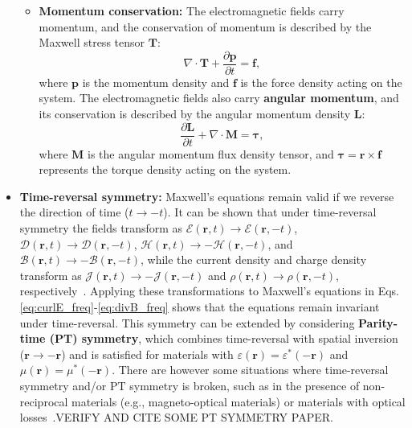 \begin{itemize}
\begin{itemize}
        \item \textbf{Momentum conservation:} The electromagnetic fields carry momentum, and the conservation of momentum is described by the Maxwell stress tensor $\mathbf{T}$:
        \begin{equation}
            \nabla \cdot \mathbf{T} + \frac{\partial \mathbf{p}}{\partial t} = \mathbf{f},
        \end{equation}
        where $\mathbf{p}$ is the momentum density and $\mathbf{f}$ is the force density acting on the system. The electromagnetic fields also carry \textbf{angular momentum}, and its conservation is described by the angular momentum density $\mathbf{L}$:
                    \begin{equation}
                        \frac{\partial \mathbf{L}}{\partial t} + \nabla \cdot \mathbf{M} = \boldsymbol{\tau},
                    \end{equation}
                    where $\mathbf{M}$ is the angular momentum flux density tensor, and $\boldsymbol{\tau} = \mathbf{r} \times \mathbf{f}$ represents the torque density acting on the system.
    \end{itemize}
    
    \item \textbf{Time-reversal symmetry:} Maxwell's equations remain valid if we reverse the direction of time ($t\to-t$). It can be shown that under time-reversal symmetry
                                                the fields transform as $\bm{\mathcal{E}}(\mathbf{r}, t)\to\bm{\mathcal{E}}(\mathbf{r}, -t)$,  $\bm{\mathcal{D}}(\mathbf{r}, t)\to\bm{\mathcal{D}}(\mathbf{r}, -t)$,
                                                 $\bm{\mathcal{H}}(\mathbf{r}, t)\to-\bm{\mathcal{H}}(\mathbf{r}, -t)$, and $\bm{\mathcal{B}}(\mathbf{r}, t)\to-\bm{\mathcal{B}}(\mathbf{r}, -t)$, while the current density and charge density transform as 
                                                 $\bm{\mathcal{J}}(\mathbf{r}, t)\to-\bm{\mathcal{J}}(\mathbf{r}, -t)$ and $\bm{\mathcal{\rho}}(\mathbf{r}, t)\to\bm{\mathcal{\rho}}(\mathbf{r}, -t)$, respectively~\cite{reciprocity}.
                                                 Applying these transformations to Maxwell's equations in Eqs. \eqref{eq:curlE_freq}-\eqref{eq:divB_freq} shows that the equations remain invariant under time-reversal. This 
                                                 symmetry can be extended by considering \textbf{Parity-time (PT) symmetry}, which combines time-reversal with spatial inversion ($\mathbf{r}\to-\mathbf{r}$) and is satisfied for materials with
                                                 $\varepsilon(\mathbf{r}) = \varepsilon^*(-\mathbf{r})$ and $\mu(\mathbf{r}) = \mu^*(-\mathbf{r})$. There are however some situations where time-reversal symmetry and/or PT symmetry is broken, 
                                                 such as in the presence of non-reciprocal materials (e.g., magneto-optical materials) or materials with optical losses~\cite{ownpub0}.VERIFY AND CITE SOME PT SYMMETRY PAPER.
        

\end{itemize}
